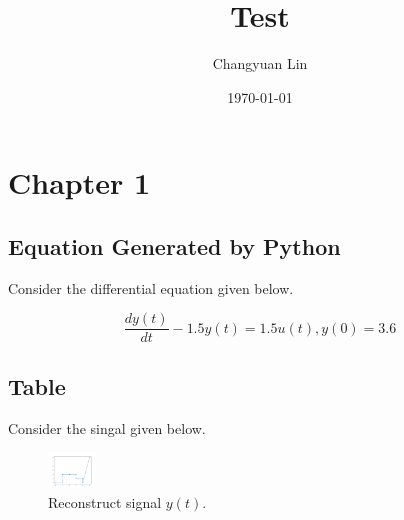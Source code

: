\documentclass[11pt]{article}
\author{Changyuan Lin}
\date{\today}
\title{Test}
\newcommand{\aDE}[4]{\begin{center}\begin{equation}\label{#4}\frac{{dy(t)}}{{dt}} -#1y(t) = #2u(t),y(0) = #3 \end{equation}\end{center}}
\begin{document}
\maketitle
\tableofcontents

\section{Chapter 1}
\label{sec-1}
\subsection{Equation Generated by Python}
\label{sec-1-1}
Consider the differential equation given below.
\aDE{1.5}{1.5}{3.6}{eq1}
\subsection{Table}
\label{sec-1-2}
Consider the singal given below.

\begin{figure}[!htpb]
\centering
\includegraphics[width=0.5in]{plot.png}
\caption{\label{FIG:fig2}Reconstruct signal \(y(t)\).}
\end{figure}
\end{document}
